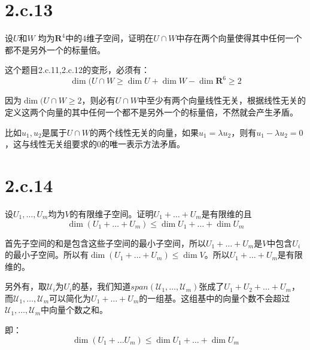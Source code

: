 \documentclass[10pt,a4paper,UTF8]{article}
\begin{document}
\section{2.c.13}
\label{sec:orga3d65d3}

\begin{problem}
设\(U\)和\(W\) 均为\(\mathbf{R}^{4}\)中的\(4\)维子空间，证明在\(U\cap W\)中存在两个向量使得其中任何一个都不是另外一个的标量倍。
\end{problem}

\begin{answer}
这个题目2.c.11,2.c.12的变形，必须有：
\begin{equation}
\label{eq:11}
\dim(U\cap W \geq \dim U + \dim W - \dim \mathbf{R}^{6} \geq 2
\end{equation}

因为\(\dim(U\cap W \geq 2\)，则必有\(U\cap W\)中至少有两个向量线性无关，根据线性无关的定义这两个向量的其中任何一个都不是另外一个的标量倍，不然就会产生矛盾。

比如\(u_{1},u_{2}\)是属于\(U\cap W\)的两个线性无关的向量，如果\(u_{1} = \lambda u_{2}\)，则有\(u_{1} - \lambda u_{2} =0\)，这与线性无关组要求的\(0\)的唯一表示方法矛盾。
\end{answer}

\section{2.c.14}
\label{sec:org984cf93}


\begin{problem}
设\(U_{1},\ldots ,U_{m}\)均为\(V\)的有限维子空间。证明\(U_{1} + \ldots + U_{m}\)是有限维的且
\begin{equation}
\label{eq:12}
\dim ( U_{1} + \ldots + U_{m}) \leq \dim U_{1} + \ldots + \dim U_{m}
\end{equation}
\end{problem}

\begin{answer}
首先子空间的和是包含这些子空间的最小子空间，所以\(U_{1}+\ldots +U_{m}\)是\(V\)中包含\(U_{i}\)的最小子空间。所以有\(\dim(U_{1} + \ldots + U_{m}) \leq \dim V\)。所以\(U_{1}+\ldots +U_{m}\)是有限维的。

另外有，取\(\mathcal{U}_{i}\)为\(U_{i}\)的基，我们知道\(span( \mathcal{U}_{1},\ldots , \mathcal{U}_{m})\)张成了\(U_{1}+U_{2}+\ldots +U_{m}\)，而\(\mathcal{U}_{1},\ldots , \mathcal{U}_{m}\)可以简化为\(U_{1}+\ldots +U_{m}\)的一组基。这组基中的向量个数不会超过\(\mathcal{U}_{1},\ldots , \mathcal{U}_{m}\)中向量个数之和。

即：
\begin{equation}
\label{eq:13}
\dim(U_{1} + \ldots U_{m}) \leq \dim U_{1} + \ldots + \dim U_{m}
\end{equation}
\end{answer}
\end{document}
